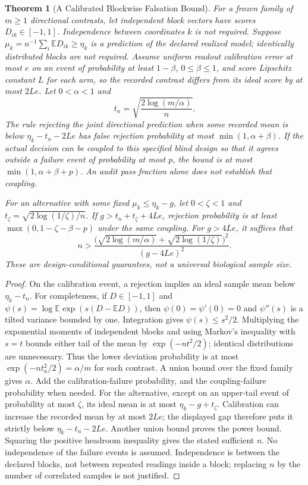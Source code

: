 \documentclass[11pt,a4paper]{article}
\newtheorem{theorem}{Theorem}[section]
\theoremstyle{definition}
\begin{document}
\begin{theorem}[A Calibrated Blockwise Falsation Bound]\label{thm:external-interface-falsation-bound}
For a frozen family of $m\ge1$ directional contrasts, let independent block vectors have scores $D_{ik}\in[-1,1]$. Independence between coordinates $k$ is not required. Suppose $\mu_k=n^{-1}\sum_i\mathbb E D_{ik}\ge\eta_k$ is a prediction of the declared realized model; identically distributed blocks are not required. Assume uniform readout calibration error at most $e$ on an event of probability at least $1-\beta$, $0\le\beta\le1$, and score Lipschitz constant $L$ for each arm, so the recorded contrast differs from its ideal score by at most $2Le$. Let $0<\alpha<1$ and
\[
 t_n=\sqrt{\frac{2\log(m/\alpha)}{n}}.
\]
The rule rejecting the joint directional prediction when some recorded mean is below $\eta_k-t_n-2Le$ has false rejection probability at most $\min(1,\alpha+\beta)$. If the actual decision can be coupled to this specified blind design so that it agrees outside a failure event of probability at most $p$, the bound is at most $\min(1,\alpha+\beta+p)$. An audit pass fraction alone does not establish that coupling.

For an alternative with some fixed $\mu_k\le\eta_k-g$, let $0<\zeta<1$ and $t_\zeta=\sqrt{2\log(1/\zeta)/n}$. If $g>t_n+t_\zeta+4Le$, rejection probability is at least $\max(0,1-\zeta-\beta-p)$ under the same coupling. For $g>4Le$, it suffices that
\[
 n>\frac{\bigl(\sqrt{2\log(m/\alpha)}+\sqrt{2\log(1/\zeta)}\bigr)^2}{(g-4Le)^2}.
\]
These are design-conditional guarantees, not a universal biological sample size.
\end{theorem}
\begin{proof}
On the calibration event, a rejection implies an ideal sample mean below $\eta_k-t_n$. For completeness, if $D\in[-1,1]$ and $\psi(s)=\log\mathbb E\exp(s(D-\mathbb ED))$, then $\psi(0)=\psi'(0)=0$ and $\psi''(s)$ is a tilted variance bounded by one. Integration gives $\psi(s)\le s^2/2$. Multiplying the exponential moments of independent blocks and using Markov's inequality with $s=t$ bounds either tail of the mean by $\exp(-nt^2/2)$; identical distributions are unnecessary. Thus the lower deviation probability is at most $\exp(-nt_n^2/2)=\alpha/m$ for each contrast. A union bound over the fixed family gives $\alpha$. Add the calibration-failure probability, and the coupling-failure probability when needed. For the alternative, except on an upper-tail event of probability at most $\zeta$, its ideal mean is at most $\eta_k-g+t_\zeta$. Calibration can increase the recorded mean by at most $2Le$; the displayed gap therefore puts it strictly below $\eta_k-t_n-2Le$. Another union bound proves the power bound. Squaring the positive headroom inequality gives the stated sufficient $n$. No independence of the failure events is assumed. Independence is between the declared blocks, not between repeated readings inside a block; replacing $n$ by the number of correlated samples is not justified.
\end{proof}
\end{document}
